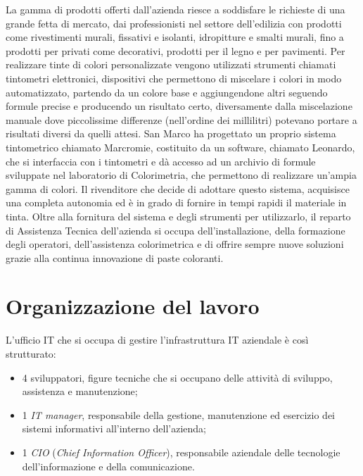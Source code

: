 La gamma di prodotti offerti dall'azienda riesce a soddisfare le richieste di una grande fetta di mercato, dai professionisti nel settore dell'edilizia con prodotti come rivestimenti murali, fissativi e isolanti, idropitture e smalti murali, fino a prodotti per privati come decorativi, prodotti per il legno e per pavimenti.
Per realizzare tinte di colori personalizzate vengono utilizzati strumenti chiamati tintometri elettronici, dispositivi che permettono di miscelare i colori in modo automatizzato, partendo da un colore base e aggiungendone altri seguendo formule precise e producendo un risultato certo, diversamente dalla miscelazione manuale dove piccolissime differenze (nell'ordine dei millilitri) potevano portare a risultati diversi da quelli attesi. San Marco ha progettato un proprio sistema tintometrico chiamato Marcromie, costituito da un software, chiamato Leonardo, che si interfaccia con i tintometri e dà accesso ad un archivio di formule sviluppate nel laboratorio di Colorimetria, che permettono di realizzare un'ampia gamma di colori. Il rivenditore che decide di adottare questo sistema, acquisisce una completa autonomia ed è in grado di fornire in tempi rapidi il materiale in tinta. Oltre alla fornitura del sistema e degli strumenti per utilizzarlo, il reparto di Assistenza Tecnica dell'azienda si occupa dell'installazione, della formazione degli operatori, dell'assistenza colorimetrica e di offrire sempre nuove soluzioni grazie alla continua innovazione di paste coloranti. 


\section{Organizzazione del lavoro}

L'ufficio IT che si occupa di gestire l'infrastruttura IT aziendale è così strutturato: 
\begin{itemize}
	\item 4 sviluppatori, figure tecniche che si occupano delle attività di sviluppo, assistenza e manutenzione; 
	\item 1 \textit{IT manager}, responsabile della gestione, manutenzione ed esercizio dei sistemi informativi all'interno dell'azienda; 
	\item 1 \textit{CIO} (\textit{Chief Information Officer}), responsabile aziendale delle tecnologie dell'informazione e della comunicazione.
\end{itemize}

